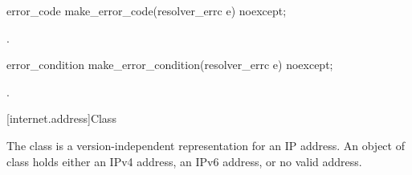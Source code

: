 %
%
\begin{itemdecl}
error_code make_error_code(resolver_errc e) noexcept;
\end{itemdecl}

\begin{itemdescr}
\pnum
\returns {}.
\end{itemdescr}

%
%
\begin{itemdecl}
error_condition make_error_condition(resolver_errc e) noexcept;
\end{itemdecl}

\begin{itemdescr}
\pnum
\returns {}.
\end{itemdescr}



[internet.address]{Class }

\pnum
The class  is a version-independent representation for an IP address. An object of class  holds either an IPv4 address, an IPv6 address, or no valid address.

